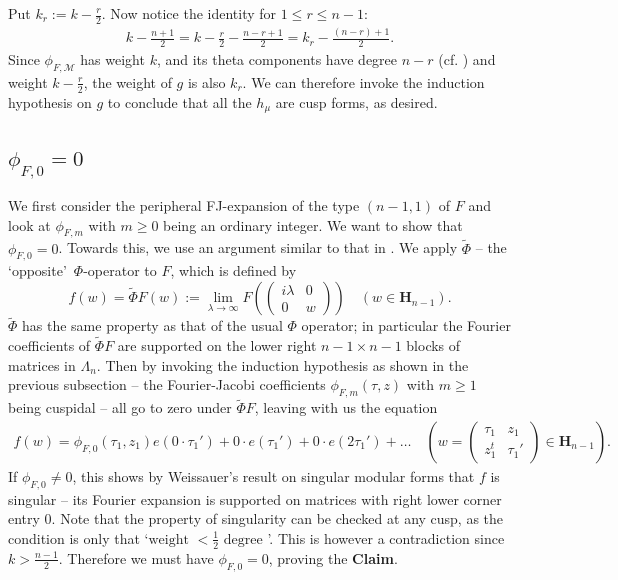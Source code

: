 \documentclass[12pt]{amsart}
\numberwithin{equation}{section}
\theoremstyle{plain}
\theoremstyle{definition}
\newcommand{\h}{\mf H}
\newcommand{\mf}{\mathbf}
\newcommand{\q}{\quad}
\newcommand{\mc}{\mathcal}
\newcommand{\psmb}{\left( \begin{smallmatrix}}
\newcommand{\psme}{ \end{smallmatrix} \right) }
\begin{document}
Put $k_r:=k - \frac{r}{2}$. Now notice the identity for $1 \le r \le n-1$:
    \begin{align}
     k-\frac{n+1}{2}= k - \frac{r}{2} - \frac{n-r+1}{2} = k_r - \frac{(n-r)+1}{2} .
\end{align}
    Since $\phi_{F, \mc M}$ has weight $k$, and its theta components have degree $n-r$ (cf. \cite[\S 3]{ziegler}) and weight $k - \frac{r}{2}$, the weight of $g$ is also $k_r$. 
 We can therefore invoke the induction hypothesis on $g$ to conclude that all the $h_\mu$ are cusp forms, as desired.

\subsection{\texorpdfstring{$\phi_{F,0}=0$}{a}} \label{M not pos-def}
We first consider the peripheral FJ-expansion of the type $(n-1,1)$ of $F$ and look at $\phi_{F,  m}$ with $ m \ge 0$ being an ordinary integer.
We want to show that $\phi_{F,0}=0$. Towards this, we use an argument similar to that in \cite[Theorem~5.7]{bo-das1}.
We  apply $\tilde \Phi$ -- the \lq opposite\rq \ $\Phi$-operator to $F$, which is defined by
\[ f(w)=\tilde \Phi F (w):=\lim_{\lambda\to\infty} F \left( \left( \begin{smallmatrix}  i\lambda & 0\\
0 & w\end{smallmatrix}\right)  \right) \q (w\in {\mf H}_{n-1}). \]
$\tilde \Phi $ has the same property as that of the usual $\Phi$ operator; in particular the Fourier coefficients of $\tilde \Phi F$ are supported on the lower right $n-1 \times n-1$ blocks of matrices in $\Lambda_n$. Then by invoking the induction hypothesis as shown in the previous subsection -- the Fourier-Jacobi coefficients $\phi_{F,  m}(\tau,z)$  with $ m \ge 1$ being cuspidal -- all go to zero under $\tilde \Phi F$, leaving with us the equation
\begin{align} \label{phi00}
    f(w)= \phi_{F,0}(\tau_1,z_1) e(0 \cdot \tau_1') + 0 \cdot e( \tau_1')  + 0 \cdot e(2 \tau_1') +\ldots \q (w= \psmb \tau_1 & z_1 \\ z_1^t & \tau_1'\psme \in \h_{n-1}).
\end{align}
If $\phi_{F,0} \neq 0$, this shows by Weissauer's result on singular modular forms that $f$ is singular -- its Fourier expansion is supported on matrices with right lower corner entry $0$. Note that the property of singularity can be checked at any cusp, as the condition is only that \lq $\text{weight } < \tfrac{1}{2}\text{ degree}$ \rq. This is however a contradiction since $k > \frac{n-1}{2}$. Therefore we must have $\phi_{F,0}=0$, proving the {\bf Claim}.
\end{document}
